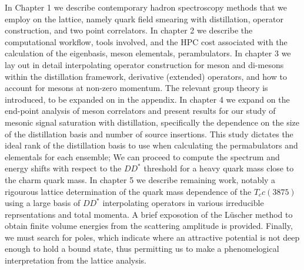 In Chapter 1 we describe contemporary hadron spectroscopy methods that we employ on the lattice,  namely quark field smearing with distillation, operator construction, and two point correlators. In chapter 2 we describe the computational workflow, tools involved, and the HPC cost associated with the calculation of the eigenbasis, meson elementals, perambulators. In chapter 3 we lay out in detail interpolating operator construction for meson and di-mesons within the distillation framework, derivative (extended) operators, and how to account for mesons at non-zero momentum. The relevant group theory is introduced, to be expanded on in the appendix. In chapter 4 we expand on the end-point analysis of meson correlators and present results for our study of mesonic signal saturation with distillation, specifically the dependence on the size of the distillation basis and number of source insertions. This study dictates the ideal rank of the distillation basis to use when calculating the permabulators and elementals for each ensemble; We can proceed to compute the spectrum and energy shifts with respect to the $DD^*$ threshold for a heavy quark mass close to the charm quark mass.  In chapter 5 we describe remaining work, notably a rigourous lattice determination of the quark mass dependence of the $T_cc(3875)$ using a large basis of $DD^*$ interpolating operators in various irreducible reprsentations and total momenta. A brief exposotion of the L\"{u}scher method to obtain finite volume energies from the scattering amplitude is provided. Finally, we must search for poles, which indicate where an attractive potential is not deep enough to hold a bound state, thus permitting us to make a phenomelogical interpretation from the lattice analysis. 
